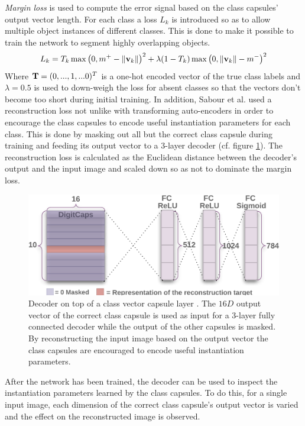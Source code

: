 \emph{Margin loss} is used to compute the error signal based on the class capsules' output vector length. For each class a loss $L_k$ is introduced so as to allow multiple object instances of different classes. This is done to make it possible to train the network to segment highly overlapping objects.
\begin{align}
    L_k = T_k \operatorname{max}\qty(0,m^+ - \norm{\vb{v}_k})^2 + \lambda \qty(1-T_k) \operatorname{max}\qty(0, \norm{\vb{v}_k}-m^-)^2
\end{align}
Where $\vb{T} = (0,...,1,...0)^T$ is a one-hot encoded vector of the true class labels and $\lambda = 0.5$ is used to down-weigh the loss for absent classes so that the vectors don't become too short during initial training. In addition, Sabour et al. used a reconstruction loss not unlike with transforming auto-encoders in order to encourage the class capsules to encode useful instantiation parameters for each class. This is done by masking out all but the correct class capsule during training and feeding its output vector to a 3-layer decoder (cf. figure \ref{fig:vector-capsules-reconstr}). The reconstruction loss is calculated as the Euclidean distance between the decoder's output and the input image and scaled down so as not to dominate the margin loss.
\begin{figure}[H]
    \centering
    \includegraphics[width=.9\textwidth]{figures/vector-capsules-reconstr.png}
\caption[Decoder on top of a class vector capsule layer]{Decoder on top of a class vector capsule layer \cite{sabour2017dynamic}. The $16D$ output vector of the correct class capsule is used as input for a 3-layer fully connected decoder while the output of the other capsules is masked. By reconstructing the input image based on the output vector the class capsules are encouraged to encode useful instantiation parameters.}\label{fig:vector-capsules-reconstr}
\end{figure}\noindent
After the network has been trained, the decoder can be used to inspect the instantiation parameters learned by the class capsules. To do this, for a single input image, each dimension of the correct class capsule's output vector is varied and the effect on the reconstructed image is observed.
